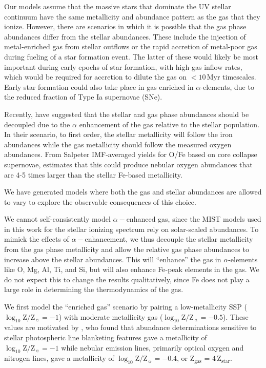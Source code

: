 \documentclass[preprint2]{aastex61}
\newcommand{\Myr}{$\,$Myr\xspace}
\newcommand{\logten}{\ensuremath{\log_{10}}}
\newcommand{\logZeq}[1]{\ensuremath{\logten \mathrm{Z}/\mathrm{Z}_{\sun} = #1}}
\begin{document}
Our models assume that the massive stars that dominate the UV stellar continuum have the same metallicity and abundance pattern as the gas that they ionize. However, there are scenarios in which it is possible that the gas phase abundances differ from the stellar abundances. These include the injection of metal-enriched gas from stellar outflows or the rapid accretion of metal-poor gas during fueling of a star formation event. The latter of these would likely be most important during early epochs of star formation, with high gas inflow rates, which would be required for accretion to dilute the gas on $<10$\Myr timescales. Early star formation could also take place in gas enriched in $\alpha$-elements, due to the reduced fraction of Type Ia supernovae (SNe).

Recently, \citet{Steidel+2016} have suggested that the stellar and gas phase abundances should be decoupled due to the $\alpha$ enhancement of the gas relative to the stellar population. In their scenario, to first order, the stellar metallicity will follow the iron abundances while the gas metallicity should follow the measured oxygen abundances. From Salpeter IMF-averaged yields for O/Fe based on core collapse supernovae, \citet{Steidel+2016} estimates that this could produce nebular oxygen abundances that are 4-5 times larger than the stellar Fe-based metallicity. 

We have generated models where both the gas and stellar abundances are allowed to vary to explore the observable consequences of this choice.

We cannot self-consistently model $\alpha-$enhanced gas, since the MIST models used in this work for the stellar ionizing spectrum rely on solar-scaled abundances. To mimick the effects of $\alpha-$enhancement, we thus decouple the stellar metallicity from the gas phase metallicity and allow the relative gas phase abundances to increase above the stellar abundances. This will ``enhance'' the gas in $\alpha$-elements like O, Mg, Al, Ti, and Si, but will also enhance Fe-peak elements in the gas. We do not expect this to change the results qualitatively, since Fe does not play a large role in determining the thermodynamics of the gas. 

We first model the ``enriched gas'' scenario by pairing a low-metallicity SSP (\logZeq{-1}) with moderate metallicity gas (\logZeq{-0.5}). These values are motivated by \citet{Steidel+2016}, who found that abundance determinations sensitive to stellar photospheric line blanketing features gave a metallicity of \logZeq{-1} while nebular emission lines, primarily optical oxygen and nitrogen lines, gave a metallicity of \logZeq{-0.4}, or Z$_{\mathrm{gas}}$ = $4\,$Z$_{\mathrm{star}}$.
\end{document}
